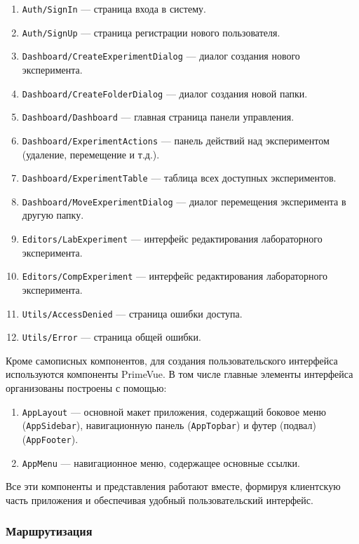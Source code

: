 \begin{enumerate}
    \item \texttt{Auth/SignIn} — страница входа в систему.
    \item \texttt{Auth/SignUp} — страница регистрации нового пользователя.
    \item \texttt{Dashboard/CreateExperimentDialog} — диалог создания нового эксперимента.
    \item \texttt{Dashboard/CreateFolderDialog} — диалог создания новой папки.
    \item \texttt{Dashboard/Dashboard} — главная страница панели управления.
    \item \texttt{Dashboard/ExperimentActions} — панель действий над экспериментом (удаление, перемещение и т.д.).
    \item \texttt{Dashboard/ExperimentTable} — таблица всех доступных экспериментов.
    \item \texttt{Dashboard/MoveExperimentDialog} — диалог перемещения эксперимента в другую папку.
    \item \texttt{Editors/LabExperiment} — интерфейс редактирования лабораторного эксперимента.
    \item \texttt{Editors/CompExperiment} — интерфейс редактирования лабораторного эксперимента.
    \item \texttt{Utils/AccessDenied} — страница ошибки доступа.
    \item \texttt{Utils/Error} — страница общей ошибки.
\end{enumerate}

Кроме самописных компонентов, для создания пользовательского интерфейса используются компоненты PrimeVue. В том числе главные элементы интерфейса организованы построены с помощью:

\begin{enumerate}
    \item \texttt{AppLayout} — основной макет приложения, содержащий боковое меню (\texttt{AppSidebar}), навигационную панель (\texttt{AppTopbar}) и футер (подвал) (\texttt{AppFooter}).
    \item \texttt{AppMenu} — навигационное меню, содержащее основные ссылки.
\end{enumerate}

Все эти компоненты и представления работают вместе, формируя клиентскую часть приложения и обеспечивая удобный пользовательский интерфейс.

\subsubsection{Маршрутизация}

